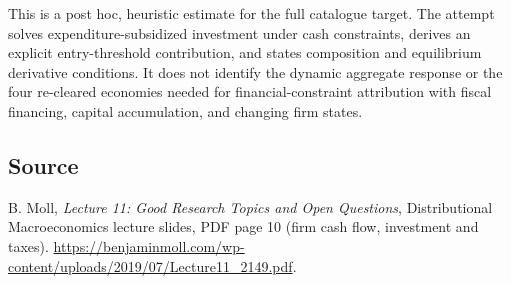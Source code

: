 \documentclass[11pt]{article}
\begin{document}
This is a post hoc, heuristic estimate for the full catalogue target.
The attempt solves expenditure-subsidized investment under cash constraints, derives an explicit entry-threshold contribution, and states composition and equilibrium derivative conditions. It does not identify the dynamic aggregate response or the four re-cleared economies needed for financial-constraint attribution with fiscal financing, capital accumulation, and changing firm states.

\subsection*{Source}
B. Moll, \emph{Lecture 11: Good Research Topics and Open Questions},
Distributional Macroeconomics lecture slides, PDF page 10 (firm cash flow,
investment and taxes).
\url{https://benjaminmoll.com/wp-content/uploads/2019/07/Lecture11_2149.pdf}.
\end{document}
